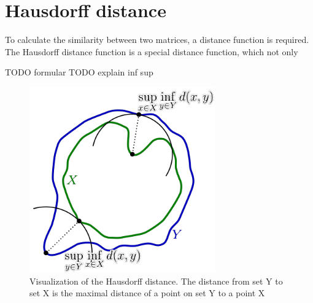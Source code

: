 \section{Hausdorff distance}

To calculate the similarity between two matrices, a distance function is required. The Hausdorff distance function is a special distance function,
which not only 

TODO formular
TODO explain inf sup

\begin{figure}[H]
\centering
\includegraphics[width=8cm]{chapters/06_hdm/images/hausdorff_distance.png}
\caption{Visualization of the Hausdorff distance. The distance from set Y to set X is the maximal distance of a point on set Y to a point X \cite{hausdorffdistanceimage}}
\label{hausdorff_distance}
\end{figure}

